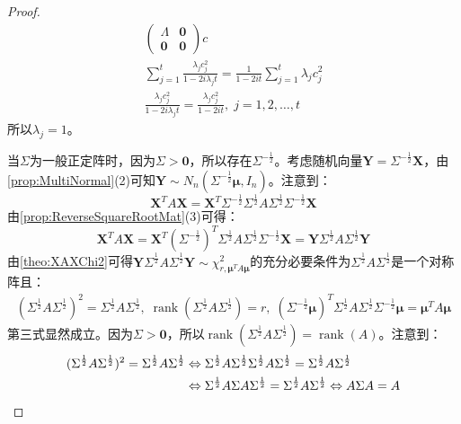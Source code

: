 \begin{proof}
\begin{gather*}
		\begin{pmatrix}
			\varLambda & \mathbf{0} \\
			\mathbf{0} & \mathbf{0}
		\end{pmatrix}
		c \\
		\sum_{j=1}^{t}\frac{\lambda_jc_j^2}{1-2i\lambda_jt}=\frac{1}{1-2it}\sum_{j=1}^{t}\lambda_jc_j^2 \\
		\frac{\lambda_jc_j^2}{1-2i\lambda_jt}=\frac{\lambda_jc_j^2}{1-2it},\;j=1,2,\dots,t
	\end{gather*}
	所以$\lambda_j=1$。\par
	当$\Sigma$为一般正定阵时，因为$\Sigma>\mathbf{0}$，所以存在$\Sigma^{-\frac{1}{2}}$。考虑随机向量$\mathbf{Y}=\Sigma^{-\frac{1}{2}}\mathbf{X}$，由\cref{prop:MultiNormal}(2)可知$\mathbf{Y}\sim N_n(\Sigma^{-\frac{1}{2}}\boldsymbol{\mu},I_n)$。注意到：
	\begin{equation*}
		\mathbf{X}^TA\mathbf{X}=\mathbf{X}^T\Sigma^{-\frac{1}{2}}\Sigma
		^{\frac{1}{2}}A\Sigma^{\frac{1}{2}}\Sigma^{-\frac{1}{2}}\mathbf{X}
	\end{equation*}
	由\cref{prop:ReverseSquareRootMat}(3)可得：
	\begin{equation*}
		\mathbf{X}^TA\mathbf{X}=\mathbf{X}^T(\Sigma^{-\frac{1}{2}})^T\Sigma
		^{\frac{1}{2}}A\Sigma^{\frac{1}{2}}\Sigma^{-\frac{1}{2}}\mathbf{X}=\mathbf{Y}\Sigma
		^{\frac{1}{2}}A\Sigma^{\frac{1}{2}}\mathbf{Y}
	\end{equation*}
	由\cref{theo:XAXChi2}可得$\mathbf{Y}\Sigma
	^{\frac{1}{2}}A\Sigma^{\frac{1}{2}}\mathbf{Y}\sim\chi_{r,\boldsymbol{\mu}^TA\boldsymbol{\mu}}^2$的充分必要条件为$\Sigma
	^{\frac{1}{2}}A\Sigma^{\frac{1}{2}}$是一个对称阵且：
	\begin{gather*}
		(\Sigma
		^{\frac{1}{2}}A\Sigma^{\frac{1}{2}})^2=\Sigma
		^{\frac{1}{2}}A\Sigma^{\frac{1}{2}},\;
		\operatorname{rank}(\Sigma
		^{\frac{1}{2}}A\Sigma^{\frac{1}{2}})=r,\;
		(\Sigma^{-\frac{1}{2}}\boldsymbol{\mu})^T\Sigma^{\frac{1}{2}} A\Sigma^{\frac{1}{2}}\Sigma^{-\frac{1}{2}}\boldsymbol{\mu}=\boldsymbol{\mu}^TA\boldsymbol{\mu}
	\end{gather*}
	第三式显然成立。因为$\Sigma>\mathbf{0}$，所以$\operatorname{rank}(\Sigma
	^{\frac{1}{2}}A\Sigma^{\frac{1}{2}})=\operatorname{rank}(A)$。注意到：
	\begin{align*}
		(\Sigma
		^{\frac{1}{2}}A\Sigma^{\frac{1}{2}})^2=\Sigma
		^{\frac{1}{2}}A\Sigma^{\frac{1}{2}}&\Leftrightarrow
		\Sigma
		^{\frac{1}{2}}A\Sigma^{\frac{1}{2}}\Sigma
		^{\frac{1}{2}}A\Sigma^{\frac{1}{2}}=\Sigma
		^{\frac{1}{2}}A\Sigma^{\frac{1}{2}} \\
		&\Leftrightarrow
		\Sigma^{\frac{1}{2}}A\Sigma A\Sigma^{\frac{1}{2}}=\Sigma
		^{\frac{1}{2}}A\Sigma^{\frac{1}{2}}\Leftrightarrow
		A\Sigma A=A\qedhere
	\end{align*}
\end{proof}
